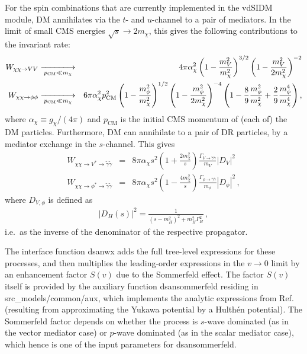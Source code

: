 \documentclass[a4paper,10pt,oneside]{book}
\newcommand{\bea}{\begin{eqnarray}}
\newcommand{\eea}{\end{eqnarray}}
\newcommand{\code}[1]{\ft{#1}}
\newcommand{\ft}[1]{\textsf{#1}}
\begin{document}
For the spin combinations that are currently implemented in the \code{vdSIDM} module,  DM annihilates via the $t$- and $u$-channel 
to a pair of mediators. In the limit of small CMS energies $\sqrt{s}\to2m_\chi$, this gives  the following contributions to the invariant rate:
\bea
 W_{\chi\chi\to VV} & \xlongrightarrow[p_\mathrm{CM}\ll m_\chi]{} & 4\pi \alpha_\chi^2\left(1-\frac{m_V^2}{m_\chi^2} \right)^{3/2} \left(1-\frac{m_V^2}{2m_\chi^2} \right)^{-2}\\
 W_{\chi\chi\to \phi\phi} & \xlongrightarrow[p_\mathrm{CM}\ll m_\chi]{} & 6\pi \alpha_\chi^2p_\mathrm{CM}^2\left(1-\frac{m_\phi^2}{m_\chi^2} \right)^{1/2} \left(1-\frac{m_\phi^2}{2m_\chi^2} \right)^{-4}\left(1-\frac89\frac{m_\phi^2}{m_\chi^2}+\frac29\frac{m_\phi^4}{m_\chi^4}   \right),
\eea
where $\alpha_\chi\equiv g_\chi/(4\pi)$ and $p_\mathrm{CM}$ is the initial CMS momentum of (each of) the DM particles.
Furthermore, DM can annihilate to a pair of DR particles, by a mediator exchange in the $s$-channel. This gives 
\bea
 W_{\chi\chi\to V^*\to\tilde\gamma\tilde\gamma} & = & 8\pi \alpha_\chi s^2\left(1+\frac{2m_\chi^2}{s} \right)
   \frac{\Gamma_{V\to\tilde\gamma\tilde\gamma}}{m_V}\left|D_{V}\right|^2\\
  W_{\chi\chi\to \phi^* \to\tilde\gamma\tilde\gamma} & = & 8\pi \alpha_\chi s^2\left(1-\frac{4m_\chi^2}{s} \right)
   \frac{\Gamma_{\phi\to\tilde\gamma\tilde\gamma}}{m_\phi}\left|D_{\phi}\right|^2\,,
\eea 
where $D_{V,\phi}$ is defined as 
\begin{align}
|D_H(s)|^2 = \frac{1}{(s-m_H^2)^2+m_H^2 \Gamma_H^2 }\,,
\end{align}
i.e.~as the inverse of the denominator of the respective propagator.

The interface function \code{dsanwx} adds the full tree-level expressions for these processes, and then multiplies
the  leading-order expressions in the $v\to0$ limit by an enhancement factor $S(v)$ due to the Sommerfeld effect.
The factor $S(v)$ itself is provided by the auxiliary function \code{dsansommerfeld} residing in \code{src\_models/common/aux},
which implements the analytic expressions from Ref.~\cite{Cassel:2009wt,Tulin:2013teo}
(resulting from approximating the Yukawa potential by a Hulth\'en potential).  The Sommerfeld factor depends on whether the 
process is $s$-wave dominated (as in the vector mediator case) or $p$-wave dominated
(as in the scalar mediator case), which hence is one of the input parameters for \code{dsansommerfeld}.
\end{document}
